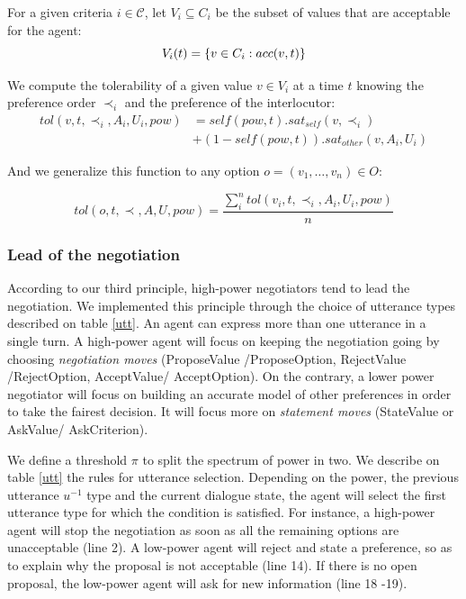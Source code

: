 \documentclass{llncs}
\begin{document}
		For a given criteria $i\in\mathcal{C}$, let $V_i\subseteq C_i$ be the subset of values that are acceptable for the agent:
		\vspace{-1em} 
		\begin{equation}
		V_i(t) = \{ v\in C_i : acc(v,t) \}
		\vspace{-0.5em} 
		\end{equation}
		
		We compute the tolerability of a given value $v\in V_i$ at a time $t$ knowing the preference order $\prec_i$ and the preference of the interlocutor:
		\vspace{-1em} 
		\begin{equation}
		\begin{split}
		tol(v, t, \prec_i, A_i, U_i, pow) & = self(pow, t) . sat_{self}(v, \prec_i) \\
		& +  (1 - self(pow, t)) . sat_{other}(v, A_i, U_i)
		\end{split} 
		\end{equation}
		
		And we generalize this function to any option $o=(v_1,\ldots,v_n) \in O$:
		
		\begin{equation}
		tol(o, t, \prec, A, U, pow) = \frac{ \sum_{i}^{n} tol(v_i, t, \prec_i, A_i, U_i, pow) } {n}
		\end{equation}
		
		
		\subsubsection{Lead of the negotiation}
		According to our third principle, high-power negotiators tend to lead the negotiation. We implemented this principle through the choice of utterance types described on table \ref{utt}. An agent can express more than one utterance in a single turn.
		A high-power agent will focus on keeping the negotiation going by choosing \emph{negotiation moves} (ProposeValue /ProposeOption, RejectValue /RejectOption, AcceptValue/ AcceptOption). On the contrary, a lower power negotiator will focus on building an accurate model of other preferences in order to take the fairest decision. It will focus more on \emph{statement moves} (StateValue or AskValue/ AskCriterion).
		
		We define a threshold $\pi$ to split the spectrum of power in two. We describe on table \ref{utt} the rules for utterance selection. Depending on the power, the previous utterance $u^{-1}$ type and the current dialogue state, the agent will select the first utterance type for which the condition is satisfied. For instance, a high-power agent will stop the negotiation as soon as all the remaining options are unacceptable (line 2). A low-power agent will reject and state a preference, so as to explain why the proposal is not acceptable (line 14). If there is no open proposal, the low-power agent will ask for new information (line 18 -19). 
		
\end{document}
